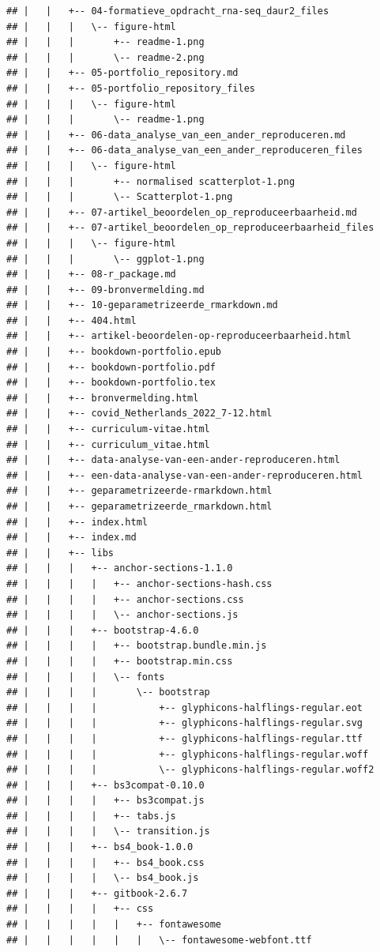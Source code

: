 \documentclass[
]{book}
\begin{document}
\begin{verbatim}
## |   |   +-- 04-formatieve_opdracht_rna-seq_daur2_files
## |   |   |   \-- figure-html
## |   |   |       +-- readme-1.png
## |   |   |       \-- readme-2.png
## |   |   +-- 05-portfolio_repository.md
## |   |   +-- 05-portfolio_repository_files
## |   |   |   \-- figure-html
## |   |   |       \-- readme-1.png
## |   |   +-- 06-data_analyse_van_een_ander_reproduceren.md
## |   |   +-- 06-data_analyse_van_een_ander_reproduceren_files
## |   |   |   \-- figure-html
## |   |   |       +-- normalised scatterplot-1.png
## |   |   |       \-- Scatterplot-1.png
## |   |   +-- 07-artikel_beoordelen_op_reproduceerbaarheid.md
## |   |   +-- 07-artikel_beoordelen_op_reproduceerbaarheid_files
## |   |   |   \-- figure-html
## |   |   |       \-- ggplot-1.png
## |   |   +-- 08-r_package.md
## |   |   +-- 09-bronvermelding.md
## |   |   +-- 10-geparametrizeerde_rmarkdown.md
## |   |   +-- 404.html
## |   |   +-- artikel-beoordelen-op-reproduceerbaarheid.html
## |   |   +-- bookdown-portfolio.epub
## |   |   +-- bookdown-portfolio.pdf
## |   |   +-- bookdown-portfolio.tex
## |   |   +-- bronvermelding.html
## |   |   +-- covid_Netherlands_2022_7-12.html
## |   |   +-- curriculum-vitae.html
## |   |   +-- curriculum_vitae.html
## |   |   +-- data-analyse-van-een-ander-reproduceren.html
## |   |   +-- een-data-analyse-van-een-ander-reproduceren.html
## |   |   +-- geparametrizeerde-rmarkdown.html
## |   |   +-- geparametrizeerde_rmarkdown.html
## |   |   +-- index.html
## |   |   +-- index.md
## |   |   +-- libs
## |   |   |   +-- anchor-sections-1.1.0
## |   |   |   |   +-- anchor-sections-hash.css
## |   |   |   |   +-- anchor-sections.css
## |   |   |   |   \-- anchor-sections.js
## |   |   |   +-- bootstrap-4.6.0
## |   |   |   |   +-- bootstrap.bundle.min.js
## |   |   |   |   +-- bootstrap.min.css
## |   |   |   |   \-- fonts
## |   |   |   |       \-- bootstrap
## |   |   |   |           +-- glyphicons-halflings-regular.eot
## |   |   |   |           +-- glyphicons-halflings-regular.svg
## |   |   |   |           +-- glyphicons-halflings-regular.ttf
## |   |   |   |           +-- glyphicons-halflings-regular.woff
## |   |   |   |           \-- glyphicons-halflings-regular.woff2
## |   |   |   +-- bs3compat-0.10.0
## |   |   |   |   +-- bs3compat.js
## |   |   |   |   +-- tabs.js
## |   |   |   |   \-- transition.js
## |   |   |   +-- bs4_book-1.0.0
## |   |   |   |   +-- bs4_book.css
## |   |   |   |   \-- bs4_book.js
## |   |   |   +-- gitbook-2.6.7
## |   |   |   |   +-- css
## |   |   |   |   |   +-- fontawesome
## |   |   |   |   |   |   \-- fontawesome-webfont.ttf

\end{verbatim}
\end{document}
